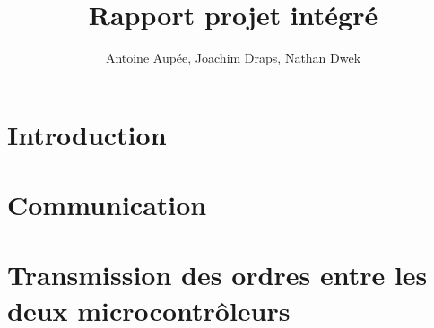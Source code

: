 \documentclass[a4paper, 11pt, frenchb]{report}
\title{Rapport projet intégré}
\author{Antoine Aupée, Joachim Draps, Nathan Dwek}
\begin{document}

\setcounter{page}{2}
\tableofcontents

\chapter{Introduction}


\chapter{Communication}


\chapter{Transmission des ordres entre les deux microcontrôleurs}


\listoffigures
\setcounter{page}{1}

\listoflistings
{}
\end{document}
